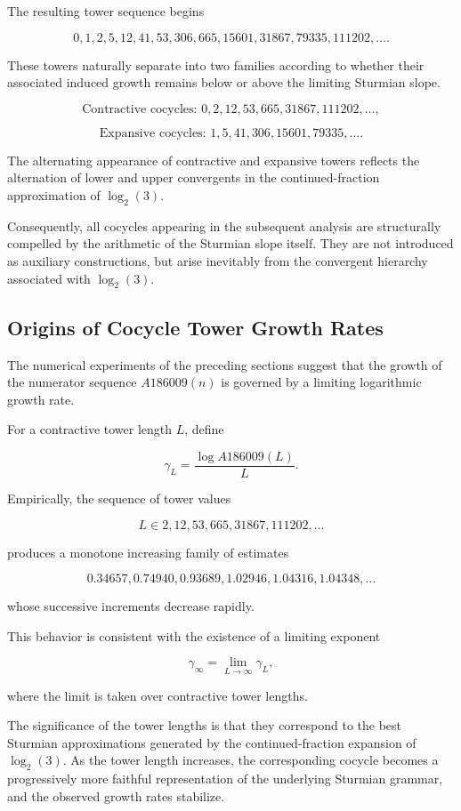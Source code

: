\documentclass[12pt, oneside]{article}
\numberwithin{equation}{section}
\theoremstyle{definition}
\theoremstyle{plain}
\theoremstyle{remark}
\begin{document}
The resulting tower sequence begins

\[
{0,1,2,5,12,41,53,306,665,15601,31867,79335,111202,\ldots}.
\]

These towers naturally separate into two families according to whether
their associated induced growth remains below or above the limiting
Sturmian slope.

\[
\text{Contractive cocycles: } {0,2,12,53,665,31867,111202,\ldots},
\]

\[
\text{Expansive cocycles: } {1,5,41,306,15601,79335,\ldots}.
\]

The alternating appearance of contractive and expansive towers reflects
the alternation of lower and upper convergents in the continued-fraction
approximation of $\log_2(3)$.

Consequently, all cocycles appearing in the subsequent analysis are
structurally compelled by the arithmetic of the Sturmian slope itself.
They are not introduced as auxiliary constructions, but arise inevitably
from the convergent hierarchy associated with $\log_2(3)$.

\subsection{Origins of Cocycle Tower Growth Rates}
\label{subsec:cocycle-growth-rates}

The numerical experiments of the preceding sections suggest that the growth of
the numerator sequence $A186009(n)$ is governed by a limiting logarithmic
growth rate.

For a contractive tower length $L$, define

\[
\gamma_L = \frac{\log A186009(L)}{L}.
\]

Empirically, the sequence of tower values

\[
L \in {2,12,53,665,31867,111202,\ldots}
\]

produces a monotone increasing family of estimates

\[
0.34657, 0.74940, 0.93689, 1.02946, 1.04316, 1.04348, \ldots
\]

whose successive increments decrease rapidly.

This behavior is consistent with the existence of a limiting exponent

\[
\gamma_\infty = \lim_{L\to\infty}\gamma_L,
\]

where the limit is taken over contractive tower lengths.

The significance of the tower lengths is that they correspond to the
best Sturmian approximations generated by the continued-fraction expansion
of $\log_2(3)$. As the tower length increases, the corresponding cocycle
becomes a progressively more faithful representation of the underlying
Sturmian grammar, and the observed growth rates stabilize.
\end{document}

